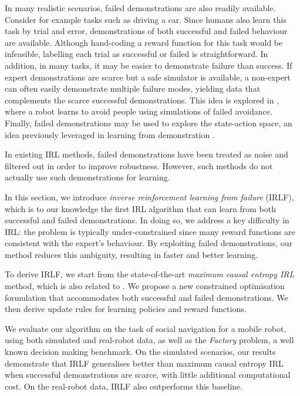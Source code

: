 \documentclass[a4paper,11pt]{report}
\begin{document}
In many realistic scenarios, failed demonstrations are also readily available.  Consider for example tasks such as driving a car.  Since humans also learn this task by trial and error, demonstrations of both successful and failed behaviour are available. Although hand-coding a reward function for this task would be infeasible, labelling each trial as successful or failed is straightforward.  
In addition, in many tasks, it may be easier to demonstrate failure than success.  If expert demonstrations are scarce but a safe simulator is available, a non-expert can often easily demonstrate multiple failure modes, yielding data that complements the scarce successful demonstrations. This idea is explored in \cite{choi2015}, where a robot learns to avoid people using simulations of failed avoidance. Finally, failed demonstrations may be used to explore the state-action space, an idea previously leveraged in learning from demonstration \cite{grollman2011donut}.

In existing IRL methods, failed demonstrations have been treated as noise \cite{zheng2014robust} and filtered out in order to improve robustness. However, such methods do not actually use such demonstrations for learning.

In this section, we introduce \emph{inverse reinforcement learning from failure} (IRLF), which is to our knowledge the first IRL algorithm that can learn from both successful and failed demonstrations. In doing so, we address a key difficulty in IRL: the problem is typically under-constrained since many reward functions are consistent with the expert's behaviour.  By exploiting failed demonstrations, our method reduces this ambiguity, resulting in faster and better learning.

To derive IRLF, we start from the state-of-the-art \emph{maximum causal entropy IRL} \cite{ziebart2008maximum,ziebart2010modelingthesis} method, which is also related to \cite{babes2011apprenticeship}. We propose a new constrained optimisation formulation that accommodates both successful and failed demonstrations.  We then derive update rules for learning policies and reward functions.

We evaluate our algorithm on the task of social navigation for a mobile robot, using both simulated and real-robot data, as well as the \emph{Factory} problem, a well known decision making benchmark. On the simulated scenarios, our results demonstrate that IRLF generalises better than maximum causal entropy IRL when successful demonstrations are scarce, with little additional computational cost.  On the real-robot data, IRLF also outperforms this baseline. 
\end{document}

